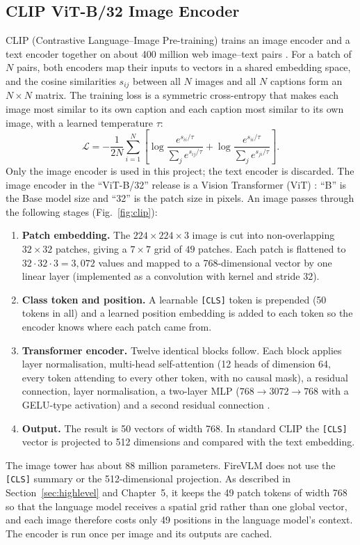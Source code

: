 \documentclass[12pt]{report}
\begin{document}
\subsection{CLIP ViT-B/32 Image Encoder}
\label{sec:clip}
CLIP (Contrastive Language--Image Pre-training) trains an image encoder and a text encoder together on about 400 million web image--text pairs \cite{radford2021}. For a batch of $N$ pairs, both encoders map their inputs to vectors in a shared embedding space, and the cosine similarities $s_{ij}$ between all $N$ images and all $N$ captions form an $N\times N$ matrix. The training loss is a symmetric cross-entropy that makes each image most similar to its own caption and each caption most similar to its own image, with a learned temperature $\tau$:
\begin{equation}
\mathcal{L}=-\frac{1}{2N}\sum_{i=1}^{N}\left[\log\frac{e^{s_{ii}/\tau}}{\sum_{j}e^{s_{ij}/\tau}}+\log\frac{e^{s_{ii}/\tau}}{\sum_{j}e^{s_{ji}/\tau}}\right].
\end{equation}
Only the image encoder is used in this project; the text encoder is discarded. The image encoder in the ``ViT-B/32'' release is a Vision Transformer (ViT) \cite{dosovitskiy2021}: ``B'' is the Base model size and ``32'' is the patch size in pixels. An image passes through the following stages (Fig.~\ref{fig:clip}):
\begin{enumerate}[leftmargin=0.5in, itemsep=2pt]
  \item \textbf{Patch embedding.} The $224\times224\times3$ image is cut into non-overlapping $32\times32$ patches, giving a $7\times7$ grid of $49$ patches. Each patch is flattened to $32\cdot32\cdot3=3{,}072$ values and mapped to a 768-dimensional vector by one linear layer (implemented as a convolution with kernel and stride 32).
  \item \textbf{Class token and position.} A learnable \texttt{[CLS]} token is prepended (50 tokens in all) and a learned position embedding is added to each token so the encoder knows where each patch came from.
  \item \textbf{Transformer encoder.} Twelve identical blocks follow. Each block applies layer normalisation, multi-head self-attention (12 heads of dimension 64, every token attending to every other token, with no causal mask), a residual connection, layer normalisation, a two-layer MLP ($768\to3072\to768$ with a GELU-type activation) and a second residual connection \cite{vaswani2017}.
  \item \textbf{Output.} The result is 50 vectors of width 768. In standard CLIP the \texttt{[CLS]} vector is projected to 512 dimensions and compared with the text embedding.
\end{enumerate}
The image tower has about 88 million parameters. FireVLM does not use the \texttt{[CLS]} summary or the 512-dimensional projection. As described in Section~\ref{sec:highlevel} and Chapter~5, it keeps the 49 patch tokens of width 768 so that the language model receives a spatial grid rather than one global vector, and each image therefore costs only 49 positions in the language model's context. The encoder is run once per image and its outputs are cached.
\end{document}
